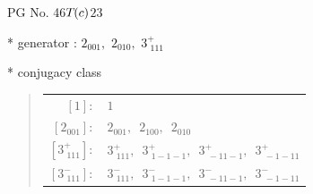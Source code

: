 \documentclass[fleqn,8pt]{jsarticle}
\begin{document}
\setcounter{MaxMatrixCols}{32}

\renewcommand{\tablename}{Table~}
\renewcommand{\figurename}{Figure~}
\begin{center}
\LARGE
PG No. 46\quad$T_{\rm }(c)$\quad$23$\quad[ cubic ]
\end{center}

* generator : $2{}_{001},\,\,2{}_{010},\,\,3^{+}_{\,\,111}$

* conjugacy class
\begin{quote}
\begin{tabular}{rl}
$ [1]: $ & $ 1 $ \\
$ [2{}_{001}]: $ & $ 2{}_{001},\,\,\,2{}_{100},\,\,\,2{}_{010} $ \\
$ [3^{+}_{\,\,111}]: $ & $ 3^{+}_{\,\,111},\,\,\,3^{+}_{\,\,1-1-1},\,\,\,3^{+}_{\,\,-11-1},\,\,\,3^{+}_{\,\,-1-11} $ \\
$ [3^{-}_{\,\,111}]: $ & $ 3^{-}_{\,\,111},\,\,\,3^{-}_{\,\,1-1-1},\,\,\,3^{-}_{\,\,-11-1},\,\,\,3^{-}_{\,\,-1-11} $
\end{tabular}
\end{quote}
\end{document}

